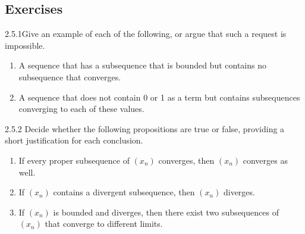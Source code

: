 \renewcommand{\theenumi}{\alph{enumi}}
\renewcommand{\labelenumi}{(\theenumi)}
\subsection{Exercises}

\begin{exercise}
    {2.5.1}Give an example of each of the following, or argue that such a request is impossible.
    \begin{enumerate}
        \item A sequence that has a subsequence that is bounded but contains no subsequence that converges.
        \item A sequence that does not contain 0 or 1 as a term but contains subsequences converging to each of these values.
    \end{enumerate}
\end{exercise}


\begin{exercise}
    {2.5.2} Decide whether the following propositions are true or false, providing a short justification for each conclusion.
    \begin{enumerate}
        \item If every proper subsequence of \((x_n)\) converges, then \((x_n)\) converges as well.
        \item If \((x_{n})\) contains a divergent subsequence, then \((x_n)\) diverges.
        \item If \((x_n)\) is bounded and diverges, then there exist two subsequences of \((x_n)\) that converge to different limits.
    \end{enumerate}
\end{exercise}


